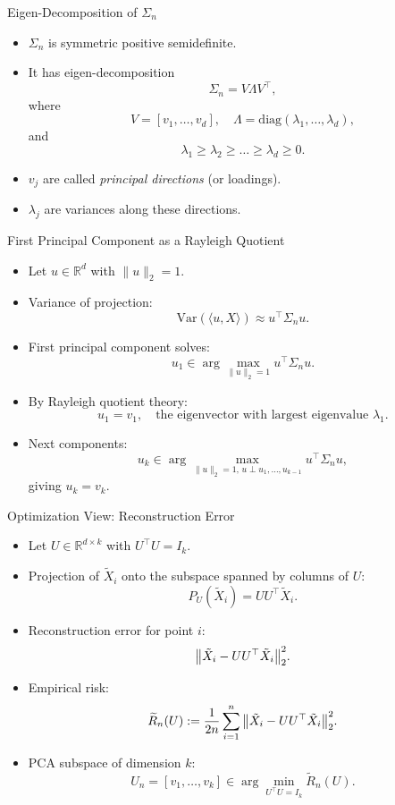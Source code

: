 \documentclass{beamer}
\newcommand{\R}{\mathbb{R}}
\newcommand{\Var}{\mathrm{Var}}
\newcommand{\1}{\mathbbm{1}}
\begin{document}
\begin{frame}{Eigen-Decomposition of $\Sigma_n$} %
  \begin{itemize}
    \item $\Sigma_n$ is symmetric positive semidefinite.
    \item It has eigen-decomposition
    \[
      \Sigma_n = V \Lambda V^\top,
    \]
    where
    \[
      V = [v_1,\dots,v_d], \quad
      \Lambda = \mathrm{diag}(\lambda_1,\dots,\lambda_d),
    \]
    and
    \[
      \lambda_1 \ge \lambda_2 \ge \dots \ge \lambda_d \ge 0.
    \]
    \item $v_j$ are called \emph{principal directions} (or loadings).
    \item $\lambda_j$ are variances along these directions.
  \end{itemize}
\end{frame}

\begin{frame}{First Principal Component as a Rayleigh Quotient} %
  \begin{itemize}
    \item Let $u \in \R^d$ with $\|u\|_2 = 1$.
    \item Variance of projection:
    \[
      \Var(\langle u, X \rangle) \approx u^\top \Sigma_n u.
    \]
    \item First principal component solves:
    \[
      u_1 \in \arg\max_{\|u\|_2 = 1} u^\top \Sigma_n u.
    \]
    \item By Rayleigh quotient theory:
    \[
      u_1 = v_1, \quad \text{the eigenvector with largest eigenvalue } \lambda_1.
    \]
    \item Next components:
    \[
      u_k \in \arg\max_{\|u\|_2 = 1,\, u \perp u_1,\dots,u_{k-1}}
      u^\top \Sigma_n u,
    \]
    giving $u_k = v_k$.
  \end{itemize}
\end{frame}

\begin{frame}{Optimization View: Reconstruction Error} %
  \begin{itemize}
    \item Let $U \in \R^{d\times k}$ with $U^\top U = I_k$.
    \item Projection of $\tilde{X}_i$ onto the subspace spanned by columns of $U$:
    \[
      P_U(\tilde{X}_i) = U U^\top \tilde{X}_i.
    \]
    \item Reconstruction error for point $i$:
    \[
      \norm{\tilde{X}_i - U U^\top \tilde{X}_i}_2^2.
    \]
    \item Empirical risk:
    \[
      \widetilde{R}_n(U)
      := \frac{1}{2n} \sum_{i=1}^n
      \norm{\tilde{X}_i - U U^\top \tilde{X}_i}_2^2.
    \]
    \item PCA subspace of dimension $k$:
    \[
      U_n = [v_1,\dots,v_k]
      \in \arg\min_{U^\top U = I_k} \widetilde{R}_n(U).
    \]
  \end{itemize}
\end{frame}
\end{document}

